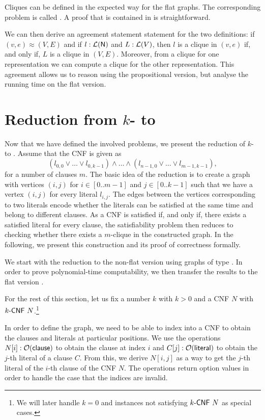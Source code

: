 Cliques can be defined in the expected way for the flat graphs. The corresponding problem is called \mnotec{\FlatClique{}}. A proof that \FlatClique{} is contained in \NP{} is straightforward. 

We can then derive an agreement statement statement for the two definitions: if $(v, e) \approx (V, E)$ and if $l : \mathcal{L} (\mathsf{N})$ and $L : \mathcal{L} (V)$, then $l$ is a clique in $(v, e)$ if, and only if, $L$ is a clique in $(V, E)$. Moreover, from a clique for one representation we can compute a clique for the other representation.
This agreement allows us to reason using the propositional version, but analyse the running time on the flat version. 

\section{Reduction from $k$-\SAT{} to \Clique{}}
Now that we have defined the involved problems, we present the reduction of $k$-\SAT{} to \Clique{}. 
Assume that the CNF is given as 
\[(l_{0, 0} \lor \ldots \lor l_{0, k-1}) \land \ldots \land (l_{n-1, 0} \lor \ldots \lor l_{m-1, k-1}), \]
for a number of clauses $m$.
The basic idea of the reduction is to create a graph with vertices $(i, j)$ for $i \in [0..m-1]$ and $j \in [0..k-1]$ such that we have a vertex $(i, j)$ for every literal $l_{i, j}$. The edges between the vertices corresponding to two literals encode whether the literals can be satisfied at the same time and belong to different clauses. As a CNF is satisfied if, and only if, there exists a satisfied literal for every clause, the satisfiability problem then reduces to checking whether there exists a $m$-clique in the constructed graph. 
In the following, we present this construction and its proof of correctness formally.

We start with the reduction to the non-flat version \Clique{} using graphs of type \UGraph{}. In order to prove polynomial-time computability, we then transfer the results to the flat version \FlatClique{}. 

For the rest of this section, let us fix a number $k$ with $k > 0$ and a CNF $N$ with $\text{$k$-\textsf{CNF}}~N$.\footnote{We will later handle $k = 0$ and instances not satisfying $\text{$k$-\textsf{CNF}}~N$ as special cases.}

In order to define the graph, we need to be able to index into a CNF to obtain the clauses and literals at particular positions. 
We use the operations $N[i] : \mathcal{O}{(\textsf{clause})}$ to obtain the clause at index $i$ and $C[j] : \mathcal{O}{(\textsf{literal})}$ to obtain the $j$-th literal of a clause $C$.
From this, we derive $N[i, j]$ as a way to get the $j$-th literal of the $i$-th clause of the CNF $N$. The operations return option values in order to handle the case that the indices are invalid.

